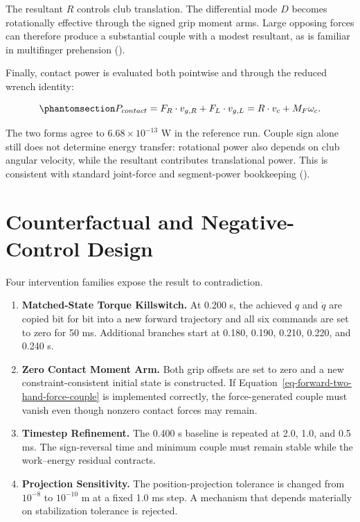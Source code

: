 \documentclass[
  letterpaper,
]{report}
\providecommand{\tightlist}{%
  \setlength{\itemsep}{0pt}\setlength{\parskip}{0pt}}
\begin{document}
The resultant \(R\) controls club translation. The differential mode
\(D\) becomes rotationally effective through the signed grip moment
arms. Large opposing forces can therefore produce a substantial couple
with a modest resultant, as is familiar in multifinger prehension
().

Finally, contact power is evaluated both pointwise and through the
reduced wrench identity:

\begin{equation}\phantomsection\label{eq-forward-two-hand-power}{
P_{contact}=F_R\cdot v_{g,R}+F_L\cdot v_{g,L}
=R\cdot v_c+M_F\omega_c.
}\end{equation}

The two forms agree to \(6.68\times10^{-13}\) W in the reference run.
Couple sign alone still does not determine energy transfer: rotational
power also depends on club angular velocity, while the resultant
contributes translational power. This is consistent with standard
joint-force and segment-power bookkeeping
().

\section{Counterfactual and Negative-Control
Design}\label{sec-forward-two-hand-interventions}

Four intervention families expose the result to contradiction.

\begin{enumerate}
\def\labelenumi{\arabic{enumi}.}
\tightlist
\item
  \textbf{Matched-State Torque Killswitch.} At 0.200 s, the achieved
  \(q\) and \(\dot q\) are copied bit for bit into a new forward
  trajectory and all six commands are set to zero for 50 ms. Additional
  branches start at 0.180, 0.190, 0.210, 0.220, and 0.240 s.
\item
  \textbf{Zero Contact Moment Arm.} Both grip offsets are set to zero
  and a new constraint-consistent initial state is constructed. If
  Equation~\ref{eq-forward-two-hand-force-couple} is implemented
  correctly, the force-generated couple must vanish even though nonzero
  contact forces may remain.
\item
  \textbf{Timestep Refinement.} The 0.400 s baseline is repeated at 2.0,
  1.0, and 0.5 ms. The sign-reversal time and minimum couple must remain
  stable while the work--energy residual contracts.
\item
  \textbf{Projection Sensitivity.} The position-projection tolerance is
  changed from \(10^{-8}\) to \(10^{-10}\) m at a fixed 1.0 ms step. A
  mechanism that depends materially on stabilization tolerance is
  rejected.
\end{enumerate}
\end{document}

